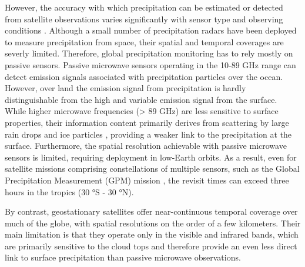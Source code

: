 \documentclass[11pt]{article}
\begin{document}
However, the accuracy with which precipitation can be estimated or detected from
satellite observations varies significantly with sensor type and observing
conditions \citep{Stephens2007RemoteSensing}. Although a small number of
precipitation radars have been deployed to measure precipitation from space,
their spatial and temporal coverages are severly limited. Therefore, global
precipitation monitoring has to rely mostly on passive sensors. Passive
microwave sensors operating in the 10-89 GHz range can detect emission signals
associated with precipitation particles over the ocean. However, over land the
emission signal from precipitation is hardly distinguishable from the high and
variable emission signal from the surface. While higher microwave frequencies (>
89 GHz) are less sensitive to surface properties, their information content
primarily derives from scattering by large rain drops and ice particles
\citep{Bennartz2003Sensitivity}, providing a weaker link to the precipitation at
the surface. Furthermore, the spatial resolution achievable with passive
microwave sensors is limited, requiring deployment in low-Earth orbits. As a
result, even for satellite missions comprising constellations of multiple
sensors, such as the Global Precipitation Measurement (GPM) mission
\cite{Hou2014GPMMission}, the revisit times can exceed three hours in the
tropics (30 °S - 30 °N).

By contrast, geostationary satellites offer near-continuous temporal coverage
over much of the globe, with spatial resolutions on the order of a few
kilometers. Their main limitation is that they operate only in the visible and
infrared bands, which are primarily sensitive to the cloud tops and therefore
provide an even less direct link to surface precipitation than passive microwave
observations.
\end{document}
